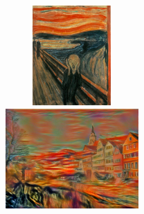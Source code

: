 \documentclass{article}
\begin{document}
\begin{figure}[ht]
    \begin{minipage}{0.45\linewidth}
    \centering
    \includegraphics[width=0.9\textwidth,height=1.5in]{img/artworks/the-scream}
    \end{minipage}
    \begin{minipage}{0.45\linewidth}
    \centering
    \includegraphics[width=0.9\textwidth,height=1.5in]{img/transfer/the-scream}
    \end{minipage}

\end{figure}



\begin{acronym}
\end{acronym}
\end{document}

